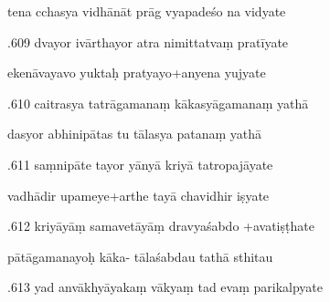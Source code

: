 \documentclass[article,12pt,a4paper]{memoir}%
\newcounter{parCount}
\begin{document}
	  
	  \pstart \leavevmode%
	tena cchasya vidhānāt prāg vyapadeśo na vidyate 
	{}
	\pend%
      

	  
	  \pstart {}.609 dvayor ivārthayor atra nimittatvaṃ pratīyate 
	{}
	\pend%
      

	  
	  \pstart \leavevmode%
	ekenāvayavo yuktaḥ pratyayo+anyena yujyate 
	{}
	\pend%
      

	  
	  \pstart {}.610 caitrasya tatrāgamanaṃ kākasyāgamanaṃ yathā 
	{}
	\pend%
      

	  
	  \pstart \leavevmode%
	dasyor abhinipātas tu tālasya patanaṃ yathā 
	{}
	\pend%
      

	  
	  \pstart {}.611 saṃnipāte tayor yānyā kriyā tatropajāyate 
	{}
	\pend%
      

	  
	  \pstart \leavevmode%
	vadhādir upameye+arthe tayā chavidhir iṣyate 
	{}
	\pend%
      

	  
	  \pstart {}.612 kriyāyāṃ samavetāyāṃ dravyaśabdo +avatiṣṭhate 
	{}
	\pend%
      

	  
	  \pstart \leavevmode%
	pātāgamanayoḥ kāka- tālaśabdau tathā sthitau 
	{}
	\pend%
      

	  
	  \pstart {}.613 yad anvākhyāyakaṃ vākyaṃ tad evaṃ parikalpyate 
	{}
	\pend%
      
\end{document}
